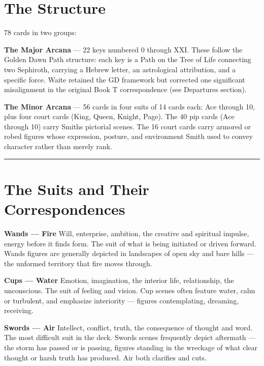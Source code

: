 \section{The Structure}\label{the-structure}

78 cards in two groups:

\textbf{The Major Arcana} --- 22 keys numbered 0 through XXI. These follow the Golden Dawn Path structure: each key is a Path on the Tree of Life connecting two Sephiroth, carrying a Hebrew letter, an astrological attribution, and a specific force. Waite retained the GD framework but corrected one significant misalignment in the original Book T correspondence (see Departures section).

\textbf{The Minor Arcana} --- 56 cards in four suits of 14 cards each: Ace through 10, plus four court cards (King, Queen, Knight, Page). The 40 pip cards (Ace through 10) carry Smith\textquotesingle s pictorial scenes. The 16 court cards carry armored or robed figures whose expression, posture, and environment Smith used to convey character rather than merely rank.

\begin{center}\rule{0.5\linewidth}{0.5pt}\end{center}

\section{The Suits and Their Correspondences}\label{the-suits-and-their-correspondences}

\textbf{Wands --- Fire} Will, enterprise, ambition, the creative and spiritual impulse, energy before it finds form. The suit of what is being initiated or driven forward. Wands figures are generally depicted in landscapes of open sky and bare hills --- the unformed territory that fire moves through.

\textbf{Cups --- Water} Emotion, imagination, the interior life, relationship, the unconscious. The suit of feeling and vision. Cup scenes often feature water, calm or turbulent, and emphasize interiority --- figures contemplating, dreaming, receiving.

\textbf{Swords --- Air} Intellect, conflict, truth, the consequence of thought and word. The most difficult suit in the deck. Swords scenes frequently depict aftermath --- the storm has passed or is passing, figures standing in the wreckage of what clear thought or harsh truth has produced. Air both clarifies and cuts.

